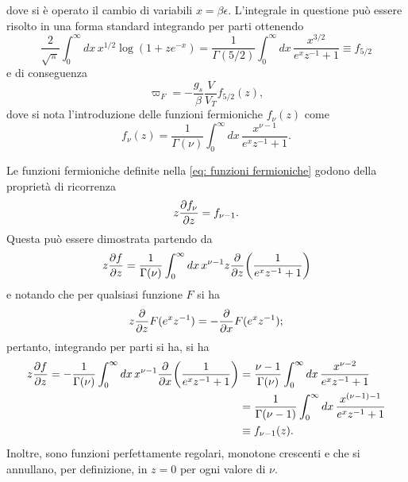 dove si è operato il cambio di variabili $x = \beta\epsilon$. L'integrale in questione può essere risolto in una forma standard integrando per parti ottenendo
\begin{equation}
    \frac{2}{\sqrt{\pi}}\int_0^\infty dx\,x^{1/2}\log{(1 + ze^{-x})} = \frac{1}{\Gamma(5/2)}\int_0^\infty dx\,\frac{x^{3/2}}{e^xz^{-1} + 1} \equiv f_{5/2}
\end{equation}
e di conseguenza
\begin{equation}
    \varpi_F = -\frac{g_s}{\beta}\frac{V}{V_T}f_{5/2}(z),
\end{equation}
dove si nota l'introduzione delle funzioni fermioniche $f_\nu(z)$ come
\begin{equation}
\label{eq: funzioni fermioniche}
    f_\nu(z) = \frac{1}{\Gamma(\nu)}\int_0^\infty dx\,\frac{x^{\nu - 1}}{e^xz^{-1} + 1}.
\end{equation}
\begin{obs}
    Le funzioni fermioniche definite nella \eqref{eq: funzioni fermioniche} godono della proprietà di ricorrenza 
    \begin{equation}
        z\frac{\partial f_\nu}{\partial z} = f_{\nu -1}.
    \end{equation}
    Questa può essere dimostrata partendo da 
    \begin{equation}
        z\frac{\partial f}{\partial z} = \frac{1}{\Gamma(\nu)}\int_0^\infty dx\,x^{\nu -1}z\frac{\partial}{\partial z}\bigg(\frac{1}{e^xz^{-1} + 1}\bigg)
    \end{equation}
    e notando che per qualsiasi funzione $F$ si ha
    \begin{equation}
        z\frac{\partial}{\partial z}F(e^xz^{-1}) = -\frac{\partial}{\partial x}F(e^xz^{-1});
    \end{equation}
    pertanto, integrando per parti si ha, si ha
    \begin{equation}
        \begin{split}
            z\frac{\partial f}{\partial z} = -\frac{1}{\Gamma(\nu)}\int_0^\infty dx\,x^{\nu -1}\frac{\partial}{\partial x}\bigg(\frac{1}{e^xz^{-1} + 1}\bigg) &= \frac{\nu - 1}{\Gamma(\nu)}\int_0^\infty dx\,\frac{x^{\nu - 2}}{e^xz^{-1} + 1} \\
            &= \frac{1}{\Gamma(\nu - 1)}\int_0^\infty dx\, \frac{x^{(\nu - 1) - 1}}{e^xz^{-1} + 1} \\
            &\equiv f_{\nu - 1}(z).
        \end{split} 
    \end{equation}
    Inoltre, sono funzioni perfettamente regolari, monotone crescenti e che si annullano, per definizione, in $z = 0$ per ogni valore di $\nu$.
\end{obs}
